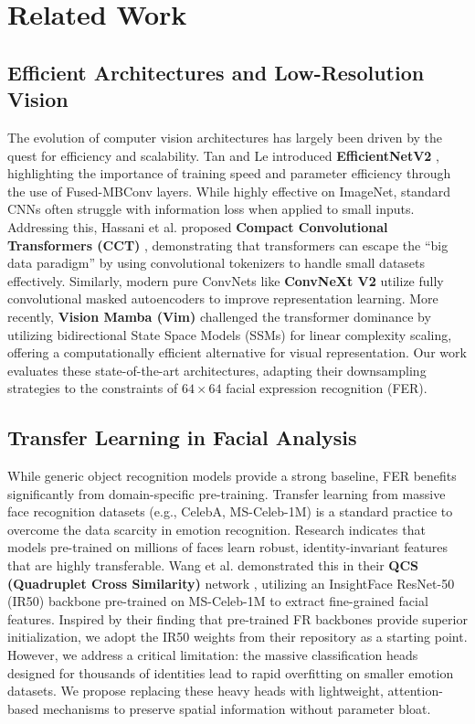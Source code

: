 \section{Related Work}
\label{sec:related}

\subsection{Efficient Architectures and Low-Resolution Vision}
The evolution of computer vision architectures has largely been driven by the quest for efficiency and scalability. Tan and Le introduced \textbf{EfficientNetV2} \cite{tan2021efficientnetv2smallermodelsfaster}, highlighting the importance of training speed and parameter efficiency through the use of Fused-MBConv layers. While highly effective on ImageNet, standard CNNs often struggle with information loss when applied to small inputs. Addressing this, Hassani et al. proposed \textbf{Compact Convolutional Transformers (CCT)} \cite{hassani2022escapingbigdataparadigm}, demonstrating that transformers can escape the ``big data paradigm'' by using convolutional tokenizers to handle small datasets effectively. Similarly, modern pure ConvNets like \textbf{ConvNeXt V2} \cite{woo2023convnextv2codesigningscaling} utilize fully convolutional masked autoencoders to improve representation learning. More recently, \textbf{Vision Mamba (Vim)} \cite{zhu2024visionmambaefficientvisual} challenged the transformer dominance by utilizing bidirectional State Space Models (SSMs) for linear complexity scaling, offering a computationally efficient alternative for visual representation. Our work evaluates these state-of-the-art architectures, adapting their downsampling strategies to the constraints of $64 \times 64$ facial expression recognition (FER).

\subsection{Transfer Learning in Facial Analysis}
While generic object recognition models provide a strong baseline, FER benefits significantly from domain-specific pre-training. Transfer learning from massive face recognition datasets (e.g., CelebA, MS-Celeb-1M) is a standard practice to overcome the data scarcity in emotion recognition. Research indicates that models pre-trained on millions of faces learn robust, identity-invariant features that are highly transferable. Wang et al. demonstrated this in their \textbf{QCS (Quadruplet Cross Similarity)} network \cite{wang2025qcsfeaturerefiningquadruplet}, utilizing an InsightFace ResNet-50 (IR50) backbone pre-trained on MS-Celeb-1M to extract fine-grained facial features. Inspired by their finding that pre-trained FR backbones provide superior initialization, we adopt the IR50 weights from their repository as a starting point. However, we address a critical limitation: the massive classification heads designed for thousands of identities lead to rapid overfitting on smaller emotion datasets. We propose replacing these heavy heads with lightweight, attention-based mechanisms to preserve spatial information without parameter bloat.

